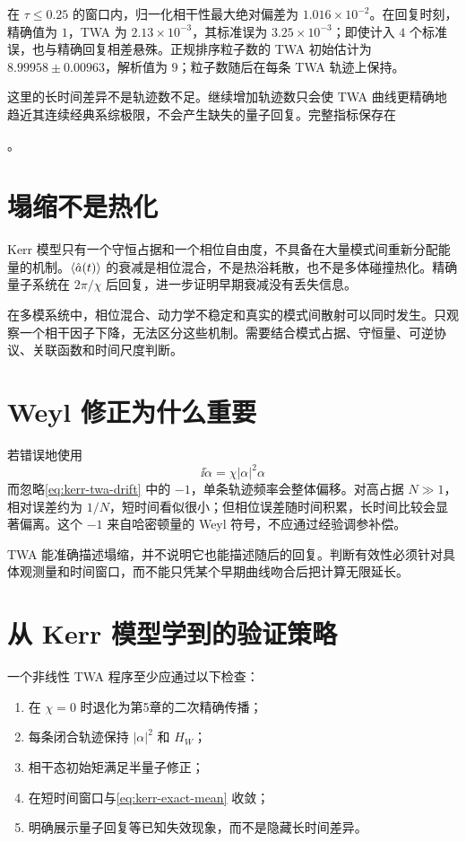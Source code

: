 在 $\tau\le0.25$ 的窗口内，归一化相干性最大绝对偏差为 $1.016\times10^{-2}$。在回复时刻，精确值为 $1$，TWA 为 $2.13\times10^{-3}$，其标准误为 $3.25\times10^{-3}$；即使计入 $4$ 个标准误，也与精确回复相差悬殊。正规排序粒子数的 TWA 初始估计为 $8.99958\pm0.00963$，解析值为 $9$；粒子数随后在每条 TWA 轨迹上保持。

这里的长时间差异不是轨迹数不足。继续增加轨迹数只会使 TWA 曲线更精确地趋近其连续经典系综极限，不会产生缺失的量子回复。完整指标保存在
\begin{center}
  。
\end{center}

\section{塌缩不是热化}

Kerr 模型只有一个守恒占据和一个相位自由度，不具备在大量模式间重新分配能量的机制。$\left\langle \hat a(t)\right\rangle$ 的衰减是相位混合，不是热浴耗散，也不是多体碰撞热化。精确量子系统在 $2\pi/\chi$ 后回复，进一步证明早期衰减没有丢失信息。

在多模系统中，相位混合、动力学不稳定和真实的模式间散射可以同时发生。只观察一个相干因子下降，无法区分这些机制。需要结合模式占据、守恒量、可逆协议、关联函数和时间尺度判断。

\section{Weyl 修正为什么重要}

若错误地使用
\begin{equation}
  \ii\dot\alpha=\chi|\alpha|^2\alpha
\end{equation}
而忽略\cref{eq:kerr-twa-drift} 中的 $-1$，单条轨迹频率会整体偏移。对高占据 $N\gg1$，相对误差约为 $1/N$，短时间看似很小；但相位误差随时间积累，长时间比较会显著偏离。这个 $-1$ 来自哈密顿量的 Weyl 符号，不应通过经验调参补偿。

\begin{warningbox}
TWA 能准确描述塌缩，并不说明它也能描述随后的回复。判断有效性必须针对具体观测量和时间窗口，而不能只凭某个早期曲线吻合后把计算无限延长。
\end{warningbox}

\section{从 Kerr 模型学到的验证策略}

一个非线性 TWA 程序至少应通过以下检查：
\begin{enumerate}
  \item 在 $\chi=0$ 时退化为第5章的二次精确传播；
  \item 每条闭合轨迹保持 $|\alpha|^2$ 和 $H_W$；
  \item 相干态初始矩满足半量子修正；
  \item 在短时间窗口与\cref{eq:kerr-exact-mean} 收敛；
  \item 明确展示量子回复等已知失效现象，而不是隐藏长时间差异。
\end{enumerate}

